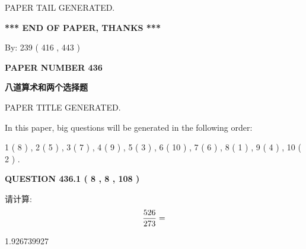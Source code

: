 \documentclass{ctexart}
\begin{document}
   
   
\vspace{2.0in} PAPER TAIL GENERATED.
   
   
   
   
\vspace{1.0in} 
{\textbf{\large{ *** END OF PAPER, THANKS *** }}} 
   
   
\hspace{1.0in} By: 
 239 ( 416 ,  443 )
   
   
   
   
\newpage 
\setcounter{page}{ 
   436001 } 
   
   
   
   
 {\textbf{ \Large{ PAPER NUMBER  436  }}}
   
   
\vspace{0.2in}
   
   
   
   
   
   
   
   
 \vspace{0.2in}
{\LARGE {\textbf{ 八道算术和两个选择题}}}
   
   
 PAPER TITLE GENERATED.
   
   
   
\vspace{0.2in}
   
In this paper, big questions will be generated in the following order: 
   
   
   1 ( 8 )
 ,
   2 ( 5 )
 ,
   3 ( 7 )
 ,
   4 ( 9 )
 ,
   5 ( 3 )
 ,
   6 ( 10 )
 ,
   7 ( 6 )
 ,
   8 ( 1 )
 ,
   9 ( 4 )
 ,
   10 ( 2 )
 .
  
\vspace{0.2in}
  
{\textbf{\Large{QUESTION
436.1 
 ( 8 , 8 , 108 )
}}}
  
  
 
请计算:
\begin{equation}
\frac { %
526 }  {  %
273} = \nonumber
\end{equation}
 
 
 
\noindent{}
 
 

1.926739927
 
 
\noindent{}
 
\end{document}

